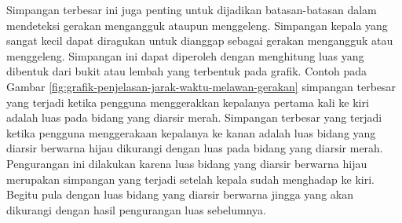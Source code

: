 Simpangan terbesar ini juga penting untuk dijadikan batasan-batasan dalam mendeteksi gerakan mengangguk ataupun menggeleng. Simpangan kepala yang sangat kecil dapat diragukan untuk dianggap sebagai gerakan mengangguk atau menggeleng. Simpangan ini dapat diperoleh dengan menghitung luas yang dibentuk dari bukit atau lembah yang terbentuk pada grafik. Contoh pada Gambar \ref{fig:grafik-penjelasan-jarak-waktu-melawan-gerakan} simpangan terbesar yang terjadi ketika pengguna menggerakkan kepalanya pertama kali ke kiri adalah luas pada bidang yang diarsir merah. Simpangan terbesar yang terjadi ketika pengguna menggerakaan kepalanya ke kanan adalah luas bidang yang diarsir berwarna hijau dikurangi dengan luas pada bidang yang diarsir merah. Pengurangan ini dilakukan karena luas bidang yang diarsir berwarna hijau merupakan simpangan yang terjadi setelah kepala sudah menghadap ke kiri. Begitu pula dengan luas bidang yang diarsir berwarna jingga yang akan dikurangi dengan hasil pengurangan luas sebelumnya.

